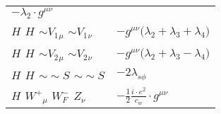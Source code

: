 \begin{center}
\begin{tabular}{|l|l|}
	$- \lambda_2\cdot g^{\mu \nu} $\\[2mm]
${H}_{}$ \phantom{-} ${H}_{}$ \phantom{-} $\sim V_1{}_{\mu }$ \phantom{-} $\sim V_1{}_{\nu }$ \phantom{-}  &
	$-g^{\mu \nu} \big( \lambda_2+ \lambda_3+ \lambda_4\big)$\\[2mm]
${H}_{}$ \phantom{-} ${H}_{}$ \phantom{-} $\sim V_2{}_{\mu }$ \phantom{-} $\sim V_2{}_{\nu }$ \phantom{-}  &
	$-g^{\mu \nu} \big( \lambda_2+ \lambda_3- \lambda_4\big)$\\[2mm]
${H}_{}$ \phantom{-} ${H}_{}$ \phantom{-} $\sim\sim S{}_{}$ \phantom{-} $\sim\sim S{}_{}$ \phantom{-}  &
	$-2 \lambda_{s\phi}$\\[2mm]
${H}_{}$ \phantom{-} $W^+{}_{\mu }$ \phantom{-} $W^-_F{}_{}$ \phantom{-} ${Z}_{\nu }$ \phantom{-}  &
	$-\frac{1}{2}\frac{ i \cdot e{}^2 }{ c_w}\cdot g^{\mu \nu} $\\ \hline
\end{tabular}


\end{center}

